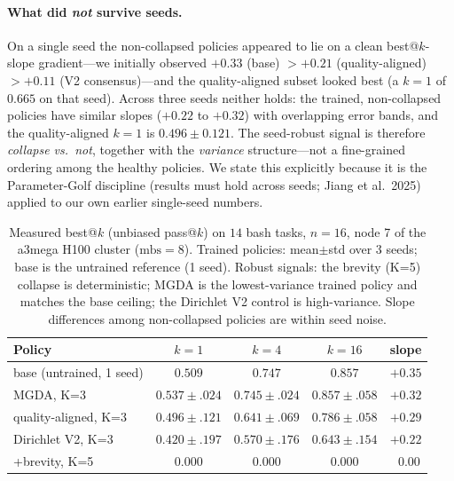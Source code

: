 \documentclass[11pt,a4paper]{article}
\begin{document}
\paragraph{What did \emph{not} survive seeds.}
On a single seed the non-collapsed policies appeared to lie on a clean
best@$k$-slope gradient---we initially observed $+0.33$ (base) $>+0.21$
(quality-aligned) $>+0.11$ (V2 consensus)---and the quality-aligned subset
looked best (a $k{=}1$ of $0.665$ on that seed).  Across three seeds neither
holds: the trained, non-collapsed policies have similar slopes ($+0.22$ to
$+0.32$) with overlapping error bands, and the quality-aligned $k{=}1$ is
$0.496\pm0.121$.  The seed-robust signal is therefore \emph{collapse vs.\ not},
together with the \emph{variance} structure---not a fine-grained ordering among
the healthy policies.  We state this explicitly because it is the Parameter-Golf
discipline (results must hold across seeds; Jiang et al.\ 2025) applied to our
own earlier single-seed numbers.

\begin{table}[h]
\centering
\caption{Measured best@$k$ (unbiased pass@$k$) on $14$ bash tasks, $n{=}16$,
node 7 of the a3mega H100 cluster ($\mathrm{mbs}{=}8$).  Trained policies:
mean$\pm$std over 3 seeds; base is the untrained reference (1 seed).  Robust
signals: the brevity (K=5) collapse is deterministic; MGDA is the lowest-variance
trained policy and matches the base ceiling; the Dirichlet V2 control is
high-variance.  Slope differences among non-collapsed policies are within seed
noise.}
\label{tab:bestk}
\begin{tabular}{@{}lcccc@{}}\toprule
Policy & $k{=}1$ & $k{=}4$ & $k{=}16$ & slope \\ \midrule
base (untrained, 1 seed)   & $0.509$            & $0.747$            & $0.857$            & $+0.35$ \\
MGDA, K=3                  & $0.537{\pm}.024$   & $0.745{\pm}.024$   & $0.857{\pm}.058$   & $+0.32$ \\
quality-aligned, K=3       & $0.496{\pm}.121$   & $0.641{\pm}.069$   & $0.786{\pm}.058$   & $+0.29$ \\
Dirichlet V2, K=3          & $0.420{\pm}.197$   & $0.570{\pm}.176$   & $0.643{\pm}.154$   & $+0.22$ \\
+brevity, K=5              & $0.000$            & $0.000$            & $0.000$            & $\;\;0.00$ \\
\bottomrule\end{tabular}
\end{table}
\end{document}
